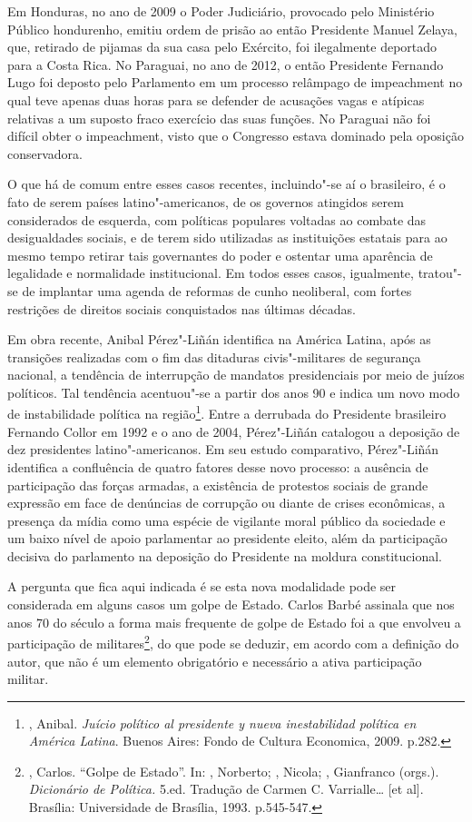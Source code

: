 Em Honduras, no ano de 2009 o Poder Judiciário, provocado pelo
Ministério Público hondurenho, emitiu ordem de prisão ao então
Presidente Manuel Zelaya, que, retirado de pijamas da sua casa pelo
Exército, foi ilegalmente deportado para a Costa Rica. No Paraguai, no
ano de 2012, o então Presidente Fernando Lugo foi deposto pelo Parlamento
em um processo relâmpago de impeachment no qual teve apenas duas horas
para se defender de acusações vagas e atípicas relativas a um suposto
fraco exercício das suas funções. No Paraguai não foi difícil obter o
impeachment, visto que o Congresso estava dominado pela oposição
conservadora.

O que há de comum entre esses casos recentes, incluindo"-se aí o
brasileiro, é o fato de serem países latino"-americanos, de os governos
atingidos serem considerados de esquerda, com políticas populares
voltadas ao combate das desigualdades sociais, e de terem sido
utilizadas as instituições estatais para ao mesmo tempo retirar tais
governantes do poder e ostentar uma aparência de legalidade e
normalidade institucional. Em todos esses casos, igualmente, tratou"-se
de implantar uma agenda de reformas de cunho neoliberal, com fortes
restrições de direitos sociais conquistados nas últimas décadas.

Em obra recente, Anibal Pérez"-Liñán identifica na América Latina, após
as transições realizadas com o fim das ditaduras civis"-militares de
segurança nacional, a tendência de interrupção de mandatos presidenciais
por meio de juízos políticos. Tal tendência acentuou"-se a partir dos
anos 90 e indica um novo modo de instabilidade política na
região\footnote{, Anibal. \emph{Juício político al
  presidente y nueva inestabilidad política en América Latina}. Buenos
  Aires: Fondo de Cultura Economica, 2009. p.282.}. Entre a derrubada do
Presidente brasileiro Fernando Collor em 1992 e o ano de 2004,
Pérez"-Liñán catalogou a deposição de dez presidentes latino"-americanos.
Em seu estudo comparativo, Pérez"-Liñán identifica a confluência de
quatro fatores desse novo processo: a ausência de participação das
forças armadas, a existência de protestos sociais de grande expressão em
face de denúncias de corrupção ou diante de crises econômicas, a
presença da mídia como uma espécie de vigilante moral público da
sociedade e um baixo nível de apoio parlamentar ao presidente eleito,
além da participação decisiva do parlamento na deposição do Presidente
na moldura constitucional.

A pergunta que fica aqui indicada é se esta nova modalidade pode ser
considerada em alguns casos um golpe de Estado. Carlos Barbé assinala
que nos anos 70 do século  a forma mais frequente de golpe de Estado
foi a que envolveu a participação de militares\footnote{, Carlos.
  ``Golpe de Estado''. In: , Norberto; , Nicola; ,
  Gianfranco (orgs.). \emph{Dicionário de Política.} 5.ed. Tradução de
  Carmen C. Varrialle\ldots{} {[}et al{]}. Brasília: Universidade de
  Brasília, 1993. p.545-547.}, do que pode se deduzir, em acordo com a
definição do autor, que não é um elemento obrigatório e necessário a
ativa participação militar.

